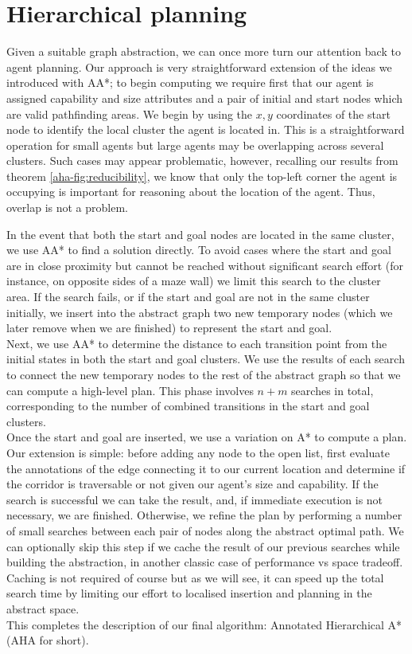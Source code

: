 \section{Hierarchical planning}
Given a suitable graph abstraction, we can once more turn our attention back to agent planning. Our approach is very straightforward extension of the ideas we introduced with AA*; to begin computing we require first that our agent is assigned capability and size attributes and a pair of initial and start nodes which are valid pathfinding areas. 
We begin by using the $x,y$ coordinates of the start node to identify the local cluster the agent is located in. This is a straightforward operation for small agents but large agents may be overlapping across several clusters. Such cases may appear problematic, however, recalling our results from theorem \ref{aha-fig:reducibility}, we know that only the top-left corner the agent is occupying is important for reasoning about the location of the agent. Thus, overlap is not a problem.

In the event that both the start and goal nodes are located in the same cluster, we use AA* to find a solution directly. To avoid cases where the start and goal are in close proximity but cannot be reached without significant search effort (for instance, on opposite sides of a maze wall) we limit this search to the cluster area. If the search fails, or if the start and goal are not in the same cluster initially, we insert into the abstract graph two new temporary nodes (which we later remove when we are finished) to represent the start and goal. \\ \newline
Next, we use AA* to determine the distance to each transition point from the initial states in both the start and goal clusters. We use the results of each search to connect the new temporary nodes to the rest of the abstract graph so that we can compute a high-level plan. This phase involves $n+m$ searches in total, corresponding to the number of combined transitions in the start and goal clusters.\\ \newline
Once the start and goal are inserted, we use a variation on A* to compute a plan. Our extension is simple: before adding any node to the open list, first evaluate the annotations of the edge connecting it to our current location and determine if the corridor is traversable or not given our agent's size and capability.
If the search is successful we can take the result, and, if immediate execution is not necessary, we are finished. Otherwise, we refine the plan by performing a number of small searches between each pair of nodes along the abstract optimal path. We can optionally skip this step if we cache the result of our previous searches while building the abstraction, in another classic case of performance vs space tradeoff. Caching is not required of course but as we will see, it can speed up the total search time by limiting our effort to localised insertion and planning in the abstract space. \\ \newline 
This completes the description of our final algorithm: Annotated Hierarchical A* (AHA for short).
